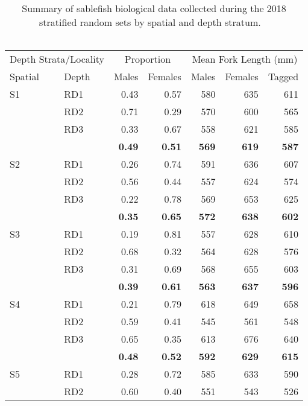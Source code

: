 \documentclass[12pt]{article}\usepackage[]{graphicx}\usepackage[]{color}
\begin{document}
\begin{table}[!h]

\caption{\label{tab:table7}Summary of sablefish biological data collected during the 2018 stratified random sets by spatial and depth stratum. ~\\
\hspace*{0.333em}\\}
\fontsize{8}{10}\selectfont
\begin{tabular}[t]{llrrrrr}
\toprule
\multicolumn{2}{c}{Depth Strata/Locality} & \multicolumn{2}{c}{Proportion} & \multicolumn{3}{c}{Mean Fork Length (mm)} \\
\cmidrule(l{3pt}r{3pt}){1-2} \cmidrule(l{3pt}r{3pt}){3-4} \cmidrule(l{3pt}r{3pt}){5-7}
Spatial & Depth & Males & Females & Males & Females & Tagged\\
\midrule
S1 & RD1 & 0.43 & 0.57 & 580 & 635 & 611\\
 & RD2 & 0.71 & 0.29 & 570 & 600 & 565\\
 & RD3 & 0.33 & 0.67 & 558 & 621 & 585\\
\hline
\textbf{} & \textbf{} & \textbf{0.49} & \textbf{0.51} & \textbf{569} & \textbf{619} & \textbf{587}\\
\hline
S2 & RD1 & 0.26 & 0.74 & 591 & 636 & 607\\
 & RD2 & 0.56 & 0.44 & 557 & 624 & 574\\
 & RD3 & 0.22 & 0.78 & 569 & 653 & 625\\
\hline
\textbf{} & \textbf{} & \textbf{0.35} & \textbf{0.65} & \textbf{572} & \textbf{638} & \textbf{602}\\
\hline
S3 & RD1 & 0.19 & 0.81 & 557 & 628 & 610\\
 & RD2 & 0.68 & 0.32 & 564 & 628 & 576\\
 & RD3 & 0.31 & 0.69 & 568 & 655 & 603\\
\hline
\textbf{} & \textbf{} & \textbf{0.39} & \textbf{0.61} & \textbf{563} & \textbf{637} & \textbf{596}\\
\hline
S4 & RD1 & 0.21 & 0.79 & 618 & 649 & 658\\
 & RD2 & 0.59 & 0.41 & 545 & 561 & 548\\
 & RD3 & 0.65 & 0.35 & 613 & 676 & 640\\
\hline
\textbf{} & \textbf{} & \textbf{0.48} & \textbf{0.52} & \textbf{592} & \textbf{629} & \textbf{615}\\
\hline
S5 & RD1 & 0.28 & 0.72 & 585 & 633 & 590\\
 & RD2 & 0.60 & 0.40 & 551 & 543 & 526\\

\end{tabular}
\end{table}
\end{document}
